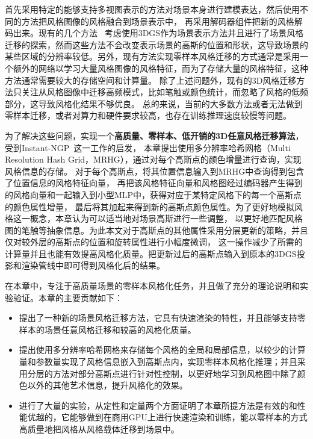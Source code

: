 首先采用特定的能够支持多视图表示的方法对场景本身进行建模表达，然后使用不同的方法把风格图像的风格融合到场景表示中，
再采用解码器组件把新的风格解码出来。现有的几个方法~\cite{saroha2024gaussian,jain2024stylesplat,zhang2024stylizedgs,chen2024gaussianeditor,liu2024stylegaussian}
考虑使用3DGS作为场景表示方法并且进行了场景风格迁移的探索，然而这些方法不会改变表示场景的高斯的位置和形状，这导致场景的某些区域的分辨率较低。另外，现有方法实现零样本风格迁移的方式通常是采用一个额外的网络以学习大量风格图像的风格特征，而为了存储大量的风格特征，这种方法通常需要较大的存储空间和计算量。
除了上述问题外，现有的3D风格迁移方法只关注从风格图像中迁移高频模式，比如笔触或颜色统计，而忽略了风格的低频部分，这导致风格化结果不够优良。
总的来说，当前的大多数方法或者无法做到零样本迁移，或者对算力和硬件要求较高，也存在训练推理速度较慢等问题。
\par 为了解决这些问题，实现一个\textbf{高质量、零样本、低开销的3D任意风格迁移算法}，受到Instant-NGP~\cite{muller2022instant}这一工作的启发，
本章提出使用多分辨率哈希网格（Multi Resolution Hash Grid，MRHG），通过对每个高斯点的颜色增量进行查询，实现风格信息的存储。
对于每个高斯点，将其位置信息输入到MRHG中查询得到包含了位置信息的风格特征向量，
再把该风格特征向量和风格图经过编码器产生得到的风格向量和一起输入到小型MLP中，获得对应于某特定风格下的每一个高斯点的颜色属性增量，
最后将其加起来得到新的高斯点颜色属性。为了更好地模拟风格这一概念，本章认为可以适当地对场景高斯进行一些调整，
以更好地匹配风格图的笔触等抽象信息。为此本文对于高斯点的其他属性采用分层更新的策略，并且仅对较外层的高斯点的位置和旋转属性进行小幅度微调，
这一操作减少了所需的计算量并且也能有效提高风格化质量。把更新过后的高斯点输入到原本的3DGS投影和渲染管线中即可得到风格化后的结果。
\par 在本章中，专注于高质量场景的零样本风格化任务，并且做了充分的理论说明和实验验证。本章的主要贡献如下：
\begin{itemize}
    \item 提出了一种新的场景风格迁移方法，它具有快速渲染的特性，并且能够支持零样本的场景任意风格迁移和较高的风格化质量。
    \item 提出使用多分辨率哈希网格来存储每个风格的全局和局部信息，以较少的计算量和参数量实现了风格信息嵌入到高斯点内，实现零样本风格化推理；并且采用分层的方法对部分高斯点进行针对性控制，以更好地学习到风格图中除了颜色以外的其他艺术信息，提升风格化的效果。
    \item 进行了大量的实验，从定性和定量两个方面证明了本章所提方法是有效的和性能优越的，它能够做到在商用GPU上进行快速渲染和训练，能以零样本的方式高质量地把风格从风格载体迁移到场景中。
\end{itemize}

